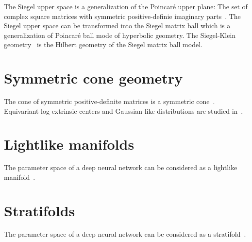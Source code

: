 \documentclass[11pt]{article}
\begin{document}
The Siegel upper space is a generalization of the Poincar\'e upper plane: The set of complex square matrices with symmetric positive-definie imaginary parts~\cite{nielsen2013matrix}. The Siegel upper space can be transformed into the Siegel matrix ball which is a generalization of Poincar\'e ball mode of hyperbolic geometry.
The Siegel-Klein geometry~\cite{nielsen2020siegel} is the Hilbert geometry of the Siegel matrix ball model.

\section*{Symmetric cone geometry}

The cone of symmetric positive-definite matrices is a symmetric cone~\cite{nielsen2023fisher}.
Equivariant log-extrinsic centers and Gaussian-like distributions are studied in~\cite{chevallier2024equivariant}.


\section*{Lightlike manifolds}

The parameter space of a deep neural network can be considered as a lightlike manifold~\cite{sun2019geometric}.

\section*{Stratifolds}

The parameter space of a deep neural network can be considered as a stratifold~\cite{esser2022influence}.



\end{document}
